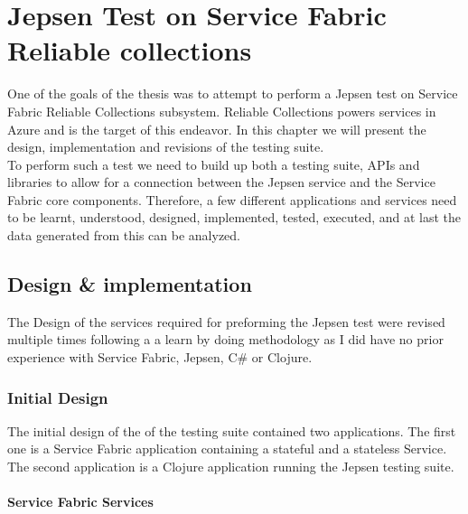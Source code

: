 \documentclass[a4paper,10pt,titlepage]{report}
\begin{document}
    \chapter{Jepsen Test on Service Fabric Reliable collections}


    One of the goals of the thesis was to attempt to perform a Jepsen test on Service Fabric Reliable Collections subsystem. Reliable Collections powers services in Azure and is the target of this endeavor. 
    In this chapter we will present the design, implementation and revisions of the testing suite. \\
    \vspace{5mm}
    To perform such a test we need to build up both a testing suite, APIs and libraries to allow for a connection between the Jepsen service and the Service Fabric core components. Therefore, a few different applications and services need to be learnt, understood, designed, implemented, tested, executed, and at last the data generated from this can be analyzed.
    
    
   
    \section{Design \& implementation}
    The Design of the services required for preforming the Jepsen test were revised multiple times following a a learn by doing methodology as I did have no prior experience with Service Fabric, Jepsen, C\# or Clojure. 

    \subsection{Initial Design}

    The initial design of the of the testing suite contained two applications. The first one is a Service Fabric application containing a stateful and a stateless Service. The second application is a Clojure application running the Jepsen testing suite.

    \subsubsection{Service Fabric Services}
\end{document}
